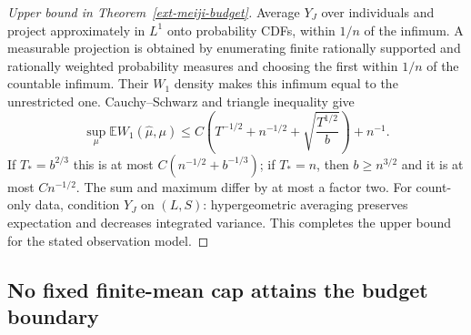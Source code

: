 \documentclass[11pt,a4paper]{article}
\theoremstyle{definition}\newtheorem{definition}[theorem]{Definition}
\theoremstyle{remark}\newtheorem{remark}[theorem]{Remark}
\newcommand{\E}{\mathbb E}\newcommand{\one}{\mathbf 1}\newcommand{\1}{\mathbf 1}
\numberwithin{equation}{section}
\begin{document}
\begin{proof}[Upper bound in Theorem~\ref{ext-meiji-budget}]
Average $Y_J$ over individuals and project approximately in $L^1$ onto
probability CDFs, within $1/n$ of the infimum. A measurable projection
is obtained by enumerating finite rationally supported and rationally
weighted probability measures and choosing the first within $1/n$ of
the countable infimum. Their $W_1$ density makes this infimum equal to
the unrestricted one. Cauchy--Schwarz and triangle inequality give
\[
 \sup_\mu\E W_1(\widehat\mu,\mu)
 \le C\left(T^{-1/2}+n^{-1/2}+\sqrt{\frac{T^{1/2}}b}\right)+n^{-1}.
\]
If $T_* =b^{2/3}$ this is at most
$C(n^{-1/2}+b^{-1/3})$; if $T_*=n$, then $b\ge n^{3/2}$ and it is at
most $C n^{-1/2}$. The sum and maximum differ by at most a factor two.
For count-only data, condition $Y_J$ on $(L,S)$: hypergeometric averaging
preserves expectation and decreases integrated variance. This completes
the upper bound for the stated observation model.
\end{proof}

\subsection{No fixed finite-mean cap attains the budget boundary}
\end{document}
